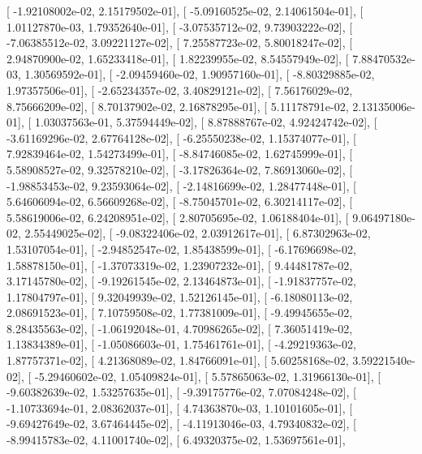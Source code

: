 \documentclass{article}
\begin{document}
       [ -1.92108002e-02,   2.15179502e-01],
       [ -5.09160525e-02,   2.14061504e-01],
       [  1.01127870e-03,   1.79352640e-01],
       [ -3.07535712e-02,   9.73903222e-02],
       [ -7.06385512e-02,   3.09221127e-02],
       [  7.25587723e-02,   5.80018247e-02],
       [  2.94870900e-02,   1.65233418e-01],
       [  1.82239955e-02,   8.54557949e-02],
       [  7.88470532e-03,   1.30569592e-01],
       [ -2.09459460e-02,   1.90957160e-01],
       [ -8.80329885e-02,   1.97357506e-01],
       [ -2.65234357e-02,   3.40829121e-02],
       [  7.56176029e-02,   8.75666209e-02],
       [  8.70137902e-02,   2.16878295e-01],
       [  5.11178791e-02,   2.13135006e-01],
       [  1.03037563e-01,   5.37594449e-02],
       [  8.87888767e-02,   4.92424742e-02],
       [ -3.61169296e-02,   2.67764128e-02],
       [ -6.25550238e-02,   1.15374077e-01],
       [  7.92839464e-02,   1.54273499e-01],
       [ -8.84746085e-02,   1.62745999e-01],
       [  5.58908527e-02,   9.32578210e-02],
       [ -3.17826364e-02,   7.86913060e-02],
       [ -1.98853453e-02,   9.23593064e-02],
       [ -2.14816699e-02,   1.28477448e-01],
       [  5.64606094e-02,   6.56609268e-02],
       [ -8.75045701e-02,   6.30214117e-02],
       [  5.58619006e-02,   6.24208951e-02],
       [  2.80705695e-02,   1.06188404e-01],
       [  9.06497180e-02,   2.55449025e-02],
       [ -9.08322406e-02,   2.03912617e-01],
       [  6.87302963e-02,   1.53107054e-01],
       [ -2.94852547e-02,   1.85438599e-01],
       [ -6.17696698e-02,   1.58878150e-01],
       [ -1.37073319e-02,   1.23907232e-01],
       [  9.44481787e-02,   3.17145780e-02],
       [ -9.19261545e-02,   2.13464873e-01],
       [ -1.91837757e-02,   1.17804797e-01],
       [  9.32049939e-02,   1.52126145e-01],
       [ -6.18080113e-02,   2.08691523e-01],
       [  7.10759508e-02,   1.77381009e-01],
       [ -9.49945655e-02,   8.28435563e-02],
       [ -1.06192048e-01,   4.70986265e-02],
       [  7.36051419e-02,   1.13834389e-01],
       [ -1.05086603e-01,   1.75461761e-01],
       [ -4.29219363e-02,   1.87757371e-02],
       [  4.21368089e-02,   1.84766091e-01],
       [  5.60258168e-02,   3.59221540e-02],
       [ -5.29460602e-02,   1.05409824e-01],
       [  5.57865063e-02,   1.31966130e-01],
       [ -9.60382639e-02,   1.53257635e-01],
       [ -9.39175776e-02,   7.07084248e-02],
       [ -1.10733694e-01,   2.08362037e-01],
       [  4.74363870e-03,   1.10101605e-01],
       [ -9.69427649e-02,   3.67464445e-02],
       [ -4.11913046e-03,   4.79340832e-02],
       [ -8.99415783e-02,   4.11001740e-02],
       [  6.49320375e-02,   1.53697561e-01],
\end{document}

